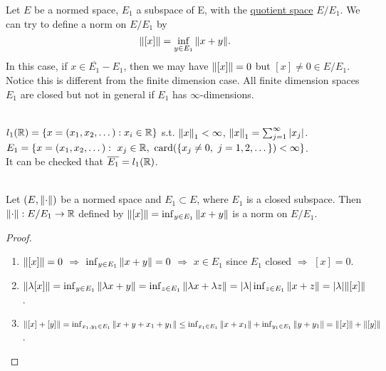 \np Let $E$ be a normed space, $E_1$ a subspace of E, with the \underline{quotient space} $E/ E_1$. We can try to define a norm on $E / E_1$ by $$\norm{[x]} = \inf_{y \in E_1} \norm{x + y}.$$
In this case, if $x \in \overline{E_1} - E_1$, then we may have $\norm{[x]} = 0$ but $[x] \neq 0 \in E/E_1$. Notice this is different from the finite dimension case. All finite dimension spaces $E_1$ are closed but not in general if $E_1$ has $\infty$-dimensions. 
\begin{example}\ \\
$l_1 (\mathbb{R}) = \{x = (x_1,x_2,\dots): x_i \in \mathbb{R}\}$ s.t. $\norm{x}_1 < \infty$, $\norm{x}_1 = \sum_{j = 1}^\infty \abs{x_j}$.\\ 
$E_1 = \{x = (x_1,x_2,\dots):\ x_j \in \R,\ \text{card}(\{x_j \neq 0,\ j = 1,2,\dots\}) < \infty \}$.\\ 
It can be checked that $\overline{E_1} = l_1(\mathbb{R})$.
\end{example}

\begin{proposition}\ \\
Let $(E, \norm{\cdot})$ be a normed space and $E_1 \subset E$, where $E_1$ is a closed subspace. Then $\norm{\cdot}: E/E_1 \to \mathbb{R}$ defined by $\norm{[x]} = \inf_{y \in E_1} \norm{x+y}$ is a norm on $E/E_1$.
\end{proposition}
\begin{proof}\
    \begin{enumerate}[label = (\alph*)]
        \item $\norm{[x]} = 0$ $\Rightarrow$ $\inf_{y \in E_1} \norm{x + y} = 0$ $\Rightarrow$ $x \in E_1$ since $E_1$ closed $\Rightarrow$ $[x] = 0$.
        \item $\norm{\lambda [x]} = \inf_{y \in E_1} \norm{\lambda x + y} = \inf_{z \in E_1} \norm{\lambda x + \lambda z} = \abs{\lambda} \inf_{z \in E_1} \norm{x +z} = \abs{\lambda} \norm{[x]}$.
        \item $\norm{[x] + [y]} = \inf_{x_1,y_1 \in E_1} \norm{x + y + x_1 + y_1} \leq \inf_{x_1 \in E_1} \norm{x + x_1} + \inf_{y_1 \in E_1} \norm{y + y_1} = \norm{[x]} + \norm{[y]}$.
    \end{enumerate}
\end{proof}